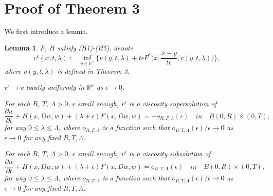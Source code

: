 \documentclass[preprint]{elsarticle}
\newtheorem{lemma}{Lemma}[section]
\numberwithin{equation}{section}
\begin{document}
\section{Proof of Theorem 3}
We first introduce a lemma.
\begin{lemma}
    $F$, $H$ satisfy (H1)-(H5), denote
    \begin{equation}
        v^{\epsilon}(x,t,\lambda):=\underset{y\in \mathbb R^n}{\inf} \{ v(y,t,\lambda)+t\epsilon F^*\big(x,\frac{x-y}{t\epsilon},v(y,t,\lambda)\big)\},
    \end{equation}
    where $v(y,t,\lambda)$ is defined in Theorem 3.
    \item[(i)] $v^{\epsilon} \rightarrow v$ locally uniformly in $\mathbb R^n$ as $\epsilon \rightarrow 0$.
    \item[(ii)] For each $R$, $T$, $\Lambda>0$, $\epsilon$ small enough, $v^\epsilon$ is a viscosity supersolution of 
    \begin{equation}
        \frac{\partial w}{\partial t} +H(x,Dw,w)+(\lambda +\epsilon)F(x,Dw,w)=-o_{R,T,\Lambda}(\epsilon) \quad in \quad B(0,R) \times (0,T),
    \end{equation}
    for any $0 \leq \lambda \leq \Lambda$, where $o_{R,T,\Lambda}$ is a function such that $o_{R,T,\Lambda}(\epsilon) /\epsilon\rightarrow 0$ as $\epsilon \rightarrow 0$ for any fixed $R,T,\Lambda$.
     \item[(iii)] For each $R$, $T$, $\Lambda>0$, $\epsilon$ small enough, $v^\epsilon$ is a viscosity subsolution of 
    \begin{equation}
        \frac{\partial w}{\partial t} +H(x,Dw,w)+(\lambda +\epsilon)F(x,Dw,w)=o_{R,T,\Lambda}(\epsilon) \quad in \quad B(0,R) \times (0,T),\label{3}
    \end{equation}
    for any $0 \leq \lambda \leq \Lambda$, where $o_{R,T,\Lambda}$ is a function such that $o_{R,T,\Lambda}(\epsilon) /\epsilon\rightarrow 0$ as $\epsilon \rightarrow 0$ for any fixed $R,T,\Lambda$.
\end{lemma}
\end{document}
